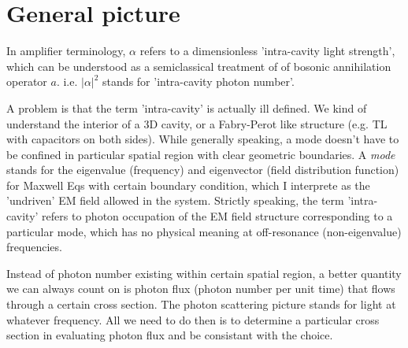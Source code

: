 \documentclass{article}
\begin{document}
%








\section{General picture}

In amplifier terminology, $\alpha$ refers to a dimensionless 'intra-cavity light strength', which can be understood as a semiclassical treatment of of bosonic annihilation operator $a$. i.e. $|\alpha|^2$ stands for 'intra-cavity photon number'. 

A problem is that the term 'intra-cavity' is actually ill defined. We kind of understand the interior of a 3D cavity, or a Fabry-Perot like structure (e.g. TL with capacitors on both sides). While generally speaking, a mode doesn't have to be confined in particular spatial region with clear geometric boundaries. A \emph{mode} stands for the eigenvalue (frequency) and eigenvector (field distribution function) for Maxwell Eqs with certain boundary condition, which I interprete as the 'undriven' EM field allowed in the system. Strictly speaking, the term 'intra-cavity' refers to photon occupation of the EM field structure corresponding to a particular mode, which has no physical meaning at off-resonance (non-eigenvalue) frequencies. 

Instead of photon number existing within certain spatial region, a better quantity we can always count on is photon flux (photon number per unit time) that flows through a certain cross section. The photon scattering picture stands for light at whatever frequency. All we need to do then is to determine a particular cross section in evaluating photon flux and be consistant with the choice. 
\end{document}
